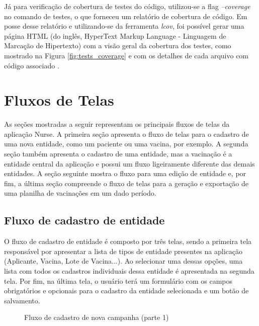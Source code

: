 Já para verificação de cobertura de testes do código, utilizou-se a flag \textit{--coverage} no comando de testes, o que forneceu um relatório de cobertura de código. Em posse desse relatório e utilizando-se da ferramenta \textit{lcov}, foi possível gerar uma página HTML (do inglês, HyperText Markup Language - Linguagem de Marcação de Hipertexto) com a visão geral da cobertura dos testes, como mostrado na Figura \ref{fig:tests_coverage} e com os detalhes de cada arquivo com código associado \cite{lcov}.


\section{Fluxos de Telas}
\label{cap5:Sec:FluxosTelas}
As seções mostradas a seguir representam os principais fluxos de telas da aplicação Nurse. A primeira seção apresenta o fluxo de telas para o cadastro de uma nova entidade, como um paciente ou uma vacina, por exemplo. A segunda seção também apresenta o cadastro de uma entidade, mas a vacinação é a entidade central da aplicação e possui um fluxo ligeiramente diferente das demais entidades. A seção seguinte mostra o fluxo para uma edição de entidade e, por fim, a última seção compreende o fluxo de telas para a geração e exportação de uma planilha de vacinações em um dado período. 

\subsection{Fluxo de cadastro de entidade}
\label{cap5:SubSec:FluxoCadastroEntidade}
O fluxo de cadastro de entidade é composto por três telas, sendo a primeira tela responsável por apresentar a lista de tipos de entidade presentes na aplicação (Aplicante, Vacina, Lote de Vacina...). Ao selecionar uma dessas opções, uma lista com todos os cadastros individuais dessa entidade é apresentada na segunda tela. Por fim, na última tela, o usuário terá um formulário com os campos obrigatórios e opcionais para o cadastro da entidade selecionada e um botão de salvamento.

\begin{figure}[ht!]
  \centering
            \qquad
            \qquad
    \caption[Fluxo de cadastro de nova campanha (parte 1)]{Fluxo de cadastro de nova campanha (parte 1)}
  
  \label{fig:new_campaign_flux_1}
\end{figure}

